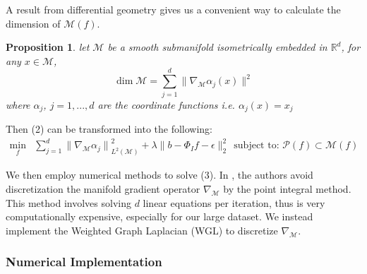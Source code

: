 \documentclass[a4paper]{article}
\newtheorem{prop}{Proposition}
\begin{document}
A result from differential geometry gives us a convenient way to calculate the dimension of $\mathcal{M}(f)$.
\begin{prop}
let $\mathcal{M}$ be a smooth submanifold isometrically embedded in $\mathbb{R}^d$, for any $x\in \mathcal{M}$, \[\dim \mathcal{M} = \sum_{j=1}^{d} \| \nabla_{\mathcal{M}} \alpha_j (x) \| ^2\]
where $\alpha_j$, $j = 1,...,d $ are the coordinate functions i.e. $\alpha_j(x) = x_j$
\end{prop}
Then (2) can be transformed into the following:
\begin{align}
\min_{f } & \sum_{j=1}^{d} {\|\nabla_{\mathcal{M}} \alpha_j\|}^2_{L^2(\mathcal{M})} + \lambda \|b-\Phi_I f -\epsilon\|^2_2 ~ ~
\text{subject to: } \mathcal{P}(f) \subset \mathcal{M}(f)
\end{align}
 

We then employ numerical methods to solve (3). In \cite{PointIntegralMethod}, the authors avoid discretization the manifold gradient operator $\nabla_{\mathcal{M}}$ by the point integral method. This method involves solving $d$ linear equations per iteration, thus is very computationally expensive, especially for our large dataset. We instead implement the Weighted Graph Laplacian (WGL) \cite{nonlocallaplacian} to discretize $\nabla_{\mathcal{M}}$.

\subsubsection{Numerical Implementation}
\end{document}
